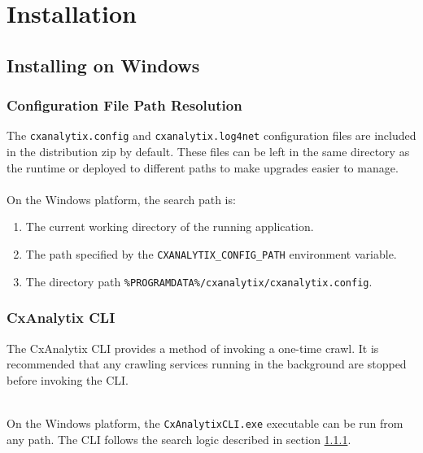 \chapter{Installation}\label{chap:installation}

\newcommand{\configstmt}[2]{
\subsection{Configuration File Path Resolution}\label{plat:#1}
    
The \texttt{cxanalytix.config} and \texttt{cxanalytix.log4net} configuration files are included in the distribution zip by default.  These
files can be left in the same directory as the runtime or deployed to different paths to make upgrades easier to manage.\\

\noindent\\On the #1 platform, the search path is:\\
\begin{enumerate}
    \item The current working directory of the running application.
    \item The path specified by the \texttt{CXANALYTIX\_CONFIG\_PATH} environment variable.
    \item The directory path \texttt{#2}.
\end{enumerate}
}

\newcommand{\clistmt}[2]{
    \subsection{CxAnalytix CLI}
    The CxAnalytix CLI provides a method of invoking a one-time crawl.  It is recommended that any crawling services running in the background
    are stopped before invoking the CLI.

    \noindent\\On the #1 platform, the \texttt{CxAnalytixCLI#2} executable can be run from any path.  The CLI follows the search logic described in section \ref{plat:#1}.
}


\section{Installing on Windows}
\newcommand{\windowsconfigpathbase}{\%PROGRAMDATA\%/cxanalytix}
\newcommand{\windowsconfigpath}{\windowsconfigpathbase/cxanalytix.config}
\configstmt{Windows}{\windowsconfigpath}
\clistmt{Windows}{.exe}

